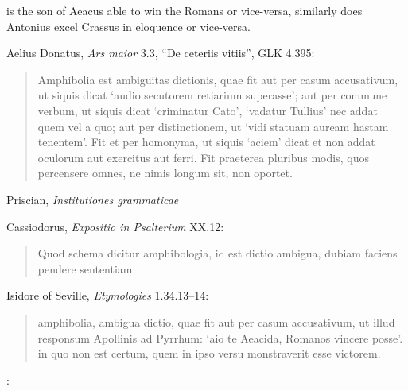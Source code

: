 \documentclass{article}
\begin{document}
is the son of Aeacus able to win the Romans or vice-versa, similarly
does Antonius excel Crassus in eloquence or vice-versa.

Aelius Donatus, {\em Ars maior} 3.3, ``De ceteriis vitiis'', GLK 4.395:

\begin{quote}
Amphibolia est ambiguitas dictionis, quae fit aut per casum accusativum, ut siquis dicat `audio secutorem retiarium superasse'; aut per commune verbum, ut siquis dicat `criminatur Cato', `vadatur Tullius' nec addat quem vel a quo; aut per distinctionem, ut `vidi statuam auream hastam tenentem'. Fit et per homonyma, ut siquis `aciem' dicat et non addat oculorum aut exercitus aut ferri. Fit praeterea pluribus modis, quos percensere omnes, ne nimis longum sit, non oportet.
\end{quote}




Priscian, {\em Institutiones grammaticae} 
















Cassiodorus, {\em Expositio in Psalterium} XX.12:

\begin{quote}
Quod schema dicitur amphibologia, id est dictio ambigua, dubiam faciens pendere sententiam.
\end{quote}

Isidore of Seville, {\em Etymologies} 1.34.13--14:

\begin{quote}
amphibolia, ambigua dictio, quae fit aut per casum
accusativum, ut illud responsum Apollinis ad Pyrrhum: `aio te
Aeacida, Romanos vincere posse'. in quo non est certum, quem
in ipso versu monstraverit esse victorem.
\end{quote}

\cite[p.~57]{isidore}:
\end{document}
